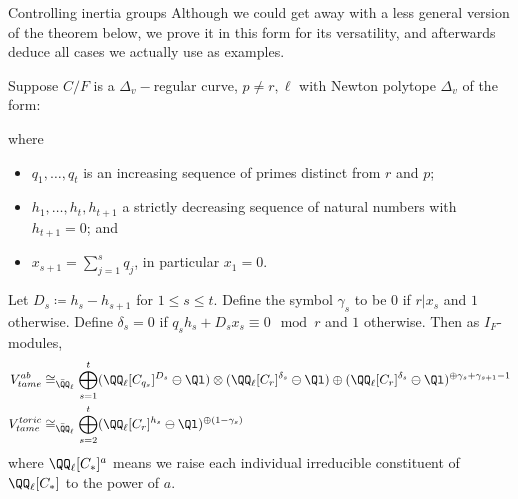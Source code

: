 \documentclass[11pt,a4paper]{article}
\newcommand{\Dv}{\Delta_v}
\newcommand{\F}{\mathcal{F}}
\begin{document}
\begin{section}{Controlling inertia groups}
Although we could get away with a less general version of the theorem below, we prove it in this form for its versatility, and afterwards deduce  all cases we actually use as examples. 

\begin{theorem}
\label{inertia_action_from_polytope}
Suppose $C/F$ is a $\Delta_v-$regular curve, $p \neq r,\ell$ with Newton polytope $\Dv$ of the form:
\begin{center}
\end{center}
where
\begin{itemize}
    \item $q_1 , \ldots , q_t$ is an increasing sequence of primes distinct from $r$ and $p$;
    \item $h_1, \ldots, h_t, h_{t+1}$ a strictly decreasing sequence of natural numbers with $h_{t+1}=0$; and


\item $x_{s+1} = \sum^{s}_{j=1}q_{j}$, in particular $x_1 =0$. %
\end{itemize}


Let $D_s\coloneqq h_s - h_{s+1}$ for $1\leq s\leq t$.
Define the symbol $\gamma_s$ to be $0$ if $r|x_{s}$ and $ 1$ otherwise.
Define $\delta_s = 0$ if $q_sh_s+D_sx_s \equiv 0 \mod{r}$  and $1$ otherwise.
Then as $I_F$-modules,
\begin{align*}
V^{ab}_{tame}  & \cong_{\Bar{\QQ}_\ell} \bigoplus^t_{s=1}  (\QQ_\ell[C_{q_s}]^{D_s} \ominus \Ql )\otimes (\QQ_\ell[C_{r}]^{\delta_s}  \ominus \Ql) \oplus (\QQ_\ell[C_{r}]^{\delta_s} \ominus \Ql)^{\oplus \gamma_s + \gamma_{s+1} -1}  \\
V^{toric}_{tame} & \cong_{\Bar{\QQ}_\ell} \bigoplus_{s=2}^{t}(\QQ_\ell[C_{r}]^{h_{s}} \ominus \Ql)^{\oplus(1- \gamma_{s})} 
\end{align*}
 where $\QQ_\ell[C_{*}]^{a}$ means we raise each individual irreducible constituent of $\QQ_\ell[C_{*}]$ to the power of $a$. 
 

\end{theorem}
\end{section}
\end{document}
